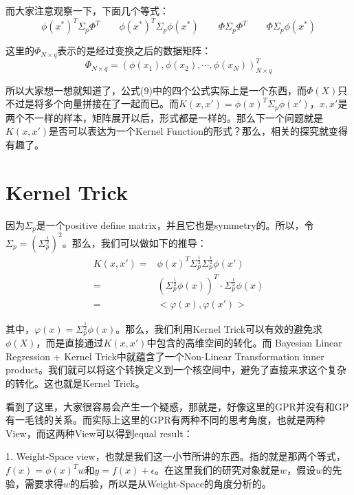 \documentclass[a4paper]{article}
\begin{document}
而大家注意观察一下，下面几个等式：
\begin{equation}
    \phi(x^\ast)^T\Sigma_p\Phi^T \qquad \phi(x^\ast)^T\Sigma_p\phi(x^\ast) \qquad
    \Phi\Sigma_p\Phi^T \qquad
    \Phi\Sigma_p\phi(x^\ast) 
\end{equation}

这里的$\Phi_{N\times q}$表示的是经过变换之后的数据矩阵：
\begin{equation}
    \Phi_{N\times q} = (\phi(x_1),\phi(x_2),\cdots,\phi(x_N))^T_{N\times q}
\end{equation}

所以大家想一想就知道了，公式(9)中的四个公式实际上是一个东西，而$\Phi(X)$只不过是将多个向量拼接在了一起而已。而$K(x,x')=\phi(x)^T\Sigma_p\phi(x')$，$x,x'$是两个不一样的样本，矩阵展开以后，形式都是一样的。那么下一个问题就是$K(x,x')$是否可以表达为一个Kernel Function的形式？那么，相关的探究就变得有趣了。

\section{Kernel Trick}
因为$\Sigma_p$是一个positive define matrix，并且它也是symmetry的。所以，令$\Sigma_p = (\Sigma_p^{\frac{1}{2}})^2$。那么，我们可以做如下的推导：
\begin{equation}
    \begin{split}
        K(x,x') 
        = & \phi(x)^T\Sigma_p^{\frac{1}{2}}\Sigma_p^{\frac{1}{2}}\phi(x') \\
        = & (\Sigma_p^{\frac{1}{2}}\phi(x))^T\cdot \Sigma_p^{\frac{1}{2}}\phi(x) \\
        = & <\varphi(x),\varphi(x')>
    \end{split}
\end{equation}

其中，$\varphi(x) = \Sigma_p^{\frac{1}{2}}\phi(x)$。那么，我们利用Kernel Trick可以有效的避免求$\phi(X)$，而是直接通过$K(x,x')$中包含的高维空间的转化。而{\color{red} Bayesian Linear Regression + Kernel Trick中就蕴含了一个Non-Linear Transformation inner product。}我们就可以将这个转换定义到一个核空间中，避免了直接来求这个复杂的转化。这也就是Kernel Trick。

看到了这里，大家很容易会产生一个疑惑，那就是，好像这里的GPR并没有和GP有一毛钱的关系。而实际上这里的GPR有两种不同的思考角度，也就是两种View，而这两种View可以得到equal result：

1. Weight-Space view，也就是我们这一小节所讲的东西。指的就是那两个等式，$f(x) = \phi(x)^Tw$和$y=f(x)+\epsilon$。在这里我们的研究对象就是$w$，假设$w$的先验，需要求得$w$的后验，所以是从Weight-Space的角度分析的。
\end{document}

